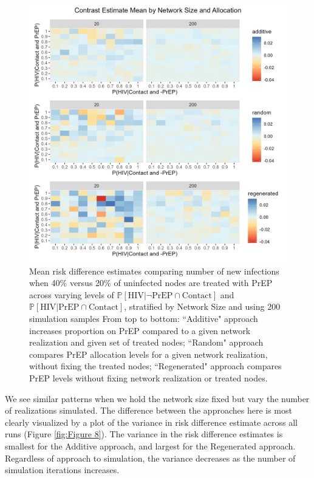 \documentclass{article}
\theoremstyle{definition}
\begin{document}
\begin{figure}[H]
    \centering
    \includegraphics[width=\linewidth]{Figures/Network Size Mean Plot.png}
    \caption{Mean risk difference estimates comparing number of new infections when 40\% versus 20\% of uninfected nodes are treated with PrEP across varying levels of $\mathbb{P}\left[\text{HIV} \vert \neg \text{PrEP} \cap \text{Contact}\right]$ and $\mathbb{P}\left[\text{HIV} \vert \text{PrEP} \cap \text{Contact}\right]$, stratified by Network Size and using 200 simulation samples 
    From top to bottom: ``Additive" approach increases proportion on PrEP compared to a given network realization and given set of treated nodes; ``Random" approach compares PrEP allocation levels for a given network realization, without fixing the treated nodes; ``Regenerated" approach compares PrEP levels without fixing network realization or treated nodes. }
    \label{fig:Figure 7}
\end{figure}

We see similar patterns when we hold the network size fixed but vary the number of realizations simulated. The difference between the approaches here is most clearly visualized by a plot of the variance in risk difference estimate across all runs (Figure \ref{fig:Figure 8}). The variance in the risk difference estimates is smallest for the Additive approach, and largest for the Regenerated approach. Regardless of approach to simulation, the variance decreases as the number of simulation iterations increases.
\end{document}
